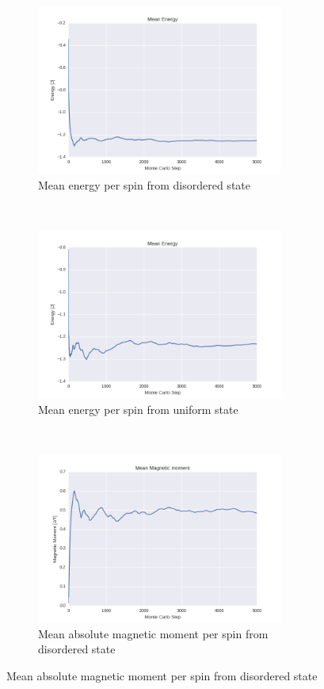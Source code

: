 \documentclass[a4paper, 10pt]{article}
\begin{document}
\begin{figure}[!ht]
    \centering
    \begin{subfigure}[H!]{0.5\textwidth}
        \centering
        \includegraphics[height=2.2in]{meanEnergyWRandomStartT24.png}
        \caption{Mean energy per spin from disordered state}
    \end{subfigure}%
    ~ 
    \begin{subfigure}[H!]{0.5\textwidth}
        \centering
        \includegraphics[height=2.2in]{meanEnergyWUpStartT24.png}
        \caption{Mean energy per spin from uniform state}
    \end{subfigure}
        ~
     \begin{subfigure}[H!]{0.5\textwidth}
        \centering
        \includegraphics[height=2.2in]{meanMagMomWRandomStartT24.png}
        \caption{Mean absolute magnetic moment per spin from disordered state}
    \end{subfigure}%

\end{figure}
\end{document}
